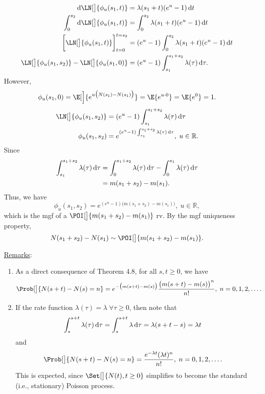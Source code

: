 \begin{Result}
\begin{align*}
        \odif{\LN[\big]{\phi_u(s_1,t)}}                      & =\lambda(s_1+t)(e^u-1)\odif{t}                         \\
        \int_{0}^{s_2}\odif{\LN[\big]{\phi_u(s_1,t)}}        & =\int_{0}^{s_2}\lambda(s_1+t)(e^u-1)\odif{t}           \\
        \biggl[\LN[\big]{\phi_u(s_1,t)}\biggr]_{t=0}^{t=s_2} & =(e^u-1)\int_{0}^{s_2}\lambda(s_1+t)(e^u-1)\odif{t}    \\
        \LN[\big]{\phi_u(s_1,s_2)}-\LN[\big]{\phi_u(s_1,0)}  & =(e^u-1)\int_{s_1}^{s_1+s_2}\lambda(\tau)\odif{\tau}.
    \end{align*}
    However,
    \[ \phi_u(s_1,0)=\E[\Big]{e^{u\bigl(N(s_1)-N(s_1)\bigr)}}=\E{e^{u\cdot 0}}=\E{e^0}=1. \]
    \begin{align*}
        \LN[\big]{\phi_u(s_1,s_2)} & =(e^u-1)\int_{s_1}^{s_1+s_2}\lambda(\tau)\odif{\tau}                        \\
        \phi_u(s_1,s_2)            & =e^{(e^u-1)\int_{s_1}^{s_1+s_2}\lambda(\tau)\odif{\tau}},\; u\in\mathbb{R}.
    \end{align*}
    Since
    \begin{align*}
        \int_{s_1}^{s_1+s_2}\lambda(\tau)\odif{\tau}
         & =\int_{0}^{s_1+s_2}\lambda(\tau)\odif{\tau}-\int_{0}^{s_1}\lambda(\tau)\odif{\tau} \\
         & =m(s_1+s_2)-m(s_1).
    \end{align*}
    Thus, we have
    \[
        \phi_u(s_1,s_2)=e^{(e^u-1)\bigl(m(s_1+s_2)-m(s_1)\bigr)},\; u\in\mathbb{R},
    \]
    which is the mgf of a $ \POI[\big]{m(s_1+s_2)-m(s_1)} $ rv. By the mgf uniqueness property,
    \[  N(s_1+s_2)-N(s_1)\sim \POI[\big]{m(s_1+s_2)-m(s_1)}. \]
\end{Result}
\underline{Remarks}:
\begin{enumerate}[(1)]
    \item As a direct consequence of Theorem 4.8, for all $ s,t\ge 0 $, we have
          \[ \Prob[\big]{N(s+t)-N(s)=n}=e^{-\bigl(m(s+t)-m(s)\bigr)}\frac{\bigl(m(s+t)-m(s)\bigr)^n}{n!},\; n=0,1,2,\ldots. \]
    \item If the rate function $ \lambda(\tau)=\lambda\; \forall \tau\ge 0 $, then note that
          \[ \int_{s}^{s+t}\lambda(\tau)\odif{\tau}=\int_{s}^{s+t}\lambda\odif{\tau}=\lambda(s+t-s)=\lambda t \]
          and
          \[ \Prob[\big]{N(s+t)-N(s)=n}=\frac{e^{-\lambda t}(\lambda t)^n}{n!},\; n=0,1,2,\ldots. \]
          This is expected, since $ \Set[\big]{N(t),t\ge 0} $ simplifies to become the standard (i.e.,
          stationary) Poisson process.
\end{enumerate}
